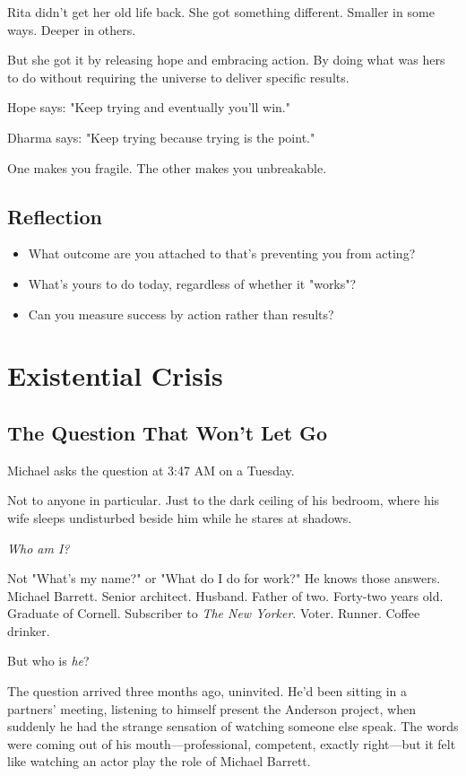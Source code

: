 \documentclass[11pt,twoside]{book}
\begin{document}
Rita didn't get her old life back. She got something different. Smaller in some ways. Deeper in others.

But she got it by releasing hope and embracing action. By doing what was hers to do without requiring the universe to deliver specific results.

Hope says: "Keep trying and eventually you'll win."

Dharma says: "Keep trying because trying is the point."

One makes you fragile. The other makes you unbreakable.

\section*{Reflection}

\begin{itemize}
\item What outcome are you attached to that's preventing you from acting?
\item What's yours to do today, regardless of whether it "works"?
\item Can you measure success by action rather than results?
\end{itemize}

\chapter{Existential Crisis}

\section*{The Question That Won't Let Go}

Michael asks the question at 3:47 AM on a Tuesday.

Not to anyone in particular. Just to the dark ceiling of his bedroom, where his wife sleeps undisturbed beside him while he stares at shadows.

\emph{Who am I?}

Not "What's my name?" or "What do I do for work?" He knows those answers. Michael Barrett. Senior architect. Husband. Father of two. Forty-two years old. Graduate of Cornell. Subscriber to \emph{The New Yorker}. Voter. Runner. Coffee drinker.

But who is \emph{he}?

The question arrived three months ago, uninvited. He'd been sitting in a partners' meeting, listening to himself present the Anderson project, when suddenly he had the strange sensation of watching someone else speak. The words were coming out of his mouth—professional, competent, exactly right—but it felt like watching an actor play the role of Michael Barrett.
\end{document}
